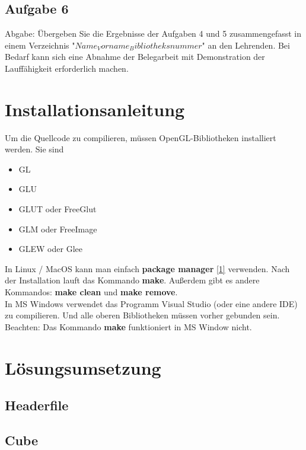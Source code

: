 \documentclass[12pt]{article}
\begin{document}
\subsection{Aufgabe 6}
Abgabe: Übergeben Sie die Ergebnisse der Aufgaben 4 und 5 zusammengefasst in einem Verzeichnis "$Name_Vorname_Bibliotheksnummer$" an den Lehrenden. Bei Bedarf kann sich eine Abnahme der Belegarbeit mit Demonstration der Lauffähigkeit erforderlich machen. \\

\pagebreak

\section{Installationsanleitung}

Um die Quellcode zu compilieren, müssen OpenGL-Bibliotheken installiert werden. Sie sind 

\begin{itemize}
	\item GL
	\item GLU
	\item GLUT oder FreeGlut
	\item GLM oder FreeImage
	\item GLEW oder Glee
\end{itemize}

In Linux / MacOS kann man einfach \textbf{package manager} \hyperref[sec:pacman]{[1]} verwenden. Nach der Installation lauft das Kommando \textbf{make}. Außerdem gibt es andere Kommandos: \textbf{make clean} und \textbf{make remove}. \\
In MS Windows verwendet das Programm Visual Studio (oder eine andere IDE) zu compilieren. Und alle oberen Bibliotheken müssen vorher gebunden sein. Beachten: Das Kommando \textbf{make} funktioniert in MS Window nicht. \\

\pagebreak

\section{Lösungsumsetzung}

\subsection{Headerfile}


\subsection{Cube}

\end{document}
